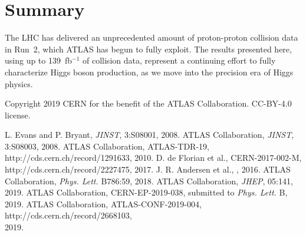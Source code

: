 \documentclass{moriond}
\def\tth{\ensuremath{t\bar{t}H}\xspace}
\begin{document}


\section{Summary}

The LHC has delivered an unprecedented amount of proton-proton collision data in Run~2, which ATLAS has begun to
fully exploit. The results presented here, using up to 139~fb$^{-1}$ of collision data,
represent a continuing effort to fully characterize Higgs boson production,
as we move into the precision era of Higgs physics.

\phantom{.}

\noindent
Copyright 2019 CERN for the benefit of the ATLAS Collaboration. CC-BY-4.0 license.

\begin{thebibliography}{99}
 L. Evans and P. Bryant, {\em JINST}, 3:S08001, 2008.
 ATLAS Collaboration, {\em JINST}, 3:S08003, 2008.
 ATLAS Collaboration, ATLAS-TDR-19, http://cds.cern.ch/record/1291633, 2010.
 D. de Florian et al., CERN-2017-002-M, http://cds.cern.ch/record/2227475, 2017.
 J. R. Andersen et al., \href{http://arxiv.org/abs/1605.04692}{\color{black}{arXiv:1605.04692}}, 2016.
 ATLAS Collaboration, {\em Phys. Lett.} B786:59, 2018.
 ATLAS Collaboration, {\em JHEP}, 05:141, 2019.
 ATLAS Collaboration, CERN-EP-2019-038, submitted to {\em Phys. Lett.} B, 2019.
 ATLAS Collaboration, ATLAS-CONF-2019-004, http://cds.cern.ch/record/2668103,\\ 2019.
\end{thebibliography}

% 
\end{document}
